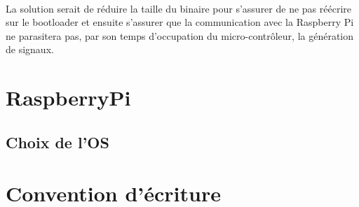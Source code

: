 \paragraph{}
  La solution serait de réduire la taille du binaire pour s'assurer de ne pas
réécrire sur le bootloader et ensuite s'assurer que la communication avec la
Raspberry Pi ne parasitera pas, par son temps d'occupation du
micro-contrôleur, la génération de signaux.\\


\section{RaspberryPi}

\subsection{Choix de l'OS}

\section{Convention d'écriture}
